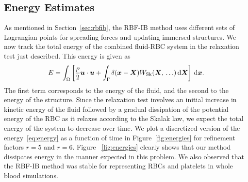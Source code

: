 \subsection{Energy Estimates}\label{sec:energy-est}

As mentioned in Section~\ref{sec:rbfib}, the RBF-IB method uses different sets of
Lagrangian points for spreading forces and updating immersed structures. We now track the
total energy of the combined fluid-RBC system in the relaxation test just described.
This energy is given as 
\begin{align}
    E = \int_\domain \left[\frac{\density}2\u\cdot\u + \int_\interface \Dirac(\x-\X)W_\text{Sk}(\X,\,\ldots)\d\X\right] \d\x.
\label{eq:energy}
\end{align}
The first term corresponds to the energy of the fluid, and the second to the energy of
the structure. Since the relaxation test involves an initial increase in kinetic energy
of the fluid followed by a gradual dissipation of the potential energy of the RBC as it
relaxes according to the Skalak law, we expect the total energy of the system to decrease
over time. We plot a discretized version of the energy~\eqref{eq:energy} as a function of
time in Figure~\ref{fig:energies} for refinement factors $r=5$ and $r=6$. Figure~%
\ref{fig:energies} clearly shows that our method dissipates energy in the manner expected
in this problem.  We also observed that the RBF-IB method was stable for representing
RBCs and platelets in whole blood simulations.


